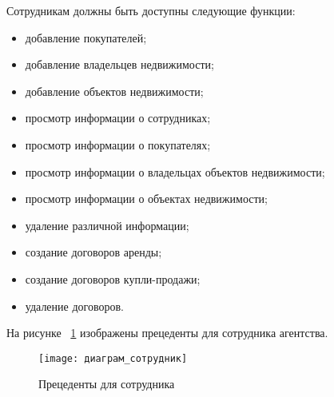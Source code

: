 Сотрудникам должны быть доступны следующие функции:
\begin{itemize}
\item	добавление покупателей;

\item	добавление владельцев недвижимости;

\item	добавление объектов недвижимости;

\item	просмотр информации о сотрудниках;

\item	просмотр информации о покупателях;

\item	просмотр информации о владельцах объектов недвижимости;

\item	просмотр информации о объектах недвижимости;

\item	удаление  различной информации;

\item	создание договоров аренды;

\item	создание договоров купли-продажи;

\item	удаление договоров.
\end{itemize}
На рисунке ~\ref{user_precedent_diagram:image} изображены прецеденты для сотрудника агентства.

\begin{figure}[H]
	\texttt{[image: диаграм\_сотрудник]}
	\caption{Прецеденты для сотрудника}
	\label{user_precedent_diagram:image}
\end{figure}

